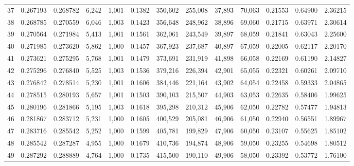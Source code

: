 \begin{tabular}{rrrrrrrrrrrrr}
37  &  0.267193 &  0.268782 &   6,242 &  1,001 &                                     0.1382 &  350,602 &  255,008 &   37,893 &   70,063 &  0.21553 &  0.64900 &  2.36215 \\
38  &  0.268785 &  0.270559 &   6,046 &  1,003 &                                     0.1423 &  356,648 &  248,962 &   38,896 &   69,060 &  0.21715 &  0.63971 &  2.30614 \\
39  &  0.270564 &  0.271984 &   5,413 &  1,001 &                                     0.1561 &  362,061 &  243,549 &   39,897 &   68,059 &  0.21841 &  0.63043 &  2.25600 \\
40  &  0.271985 &  0.273620 &   5,862 &  1,000 &                                     0.1457 &  367,923 &  237,687 &   40,897 &   67,059 &  0.22005 &  0.62117 &  2.20170 \\
41  &  0.273621 &  0.275295 &   5,768 &  1,001 &                                     0.1479 &  373,691 &  231,919 &   41,898 &   66,058 &  0.22169 &  0.61190 &  2.14827 \\
42  &  0.275296 &  0.276840 &   5,525 &  1,003 &                                     0.1536 &  379,216 &  226,394 &   42,901 &   65,055 &  0.22321 &  0.60261 &  2.09710 \\
43  &  0.276842 &  0.278514 &   5,230 &  1,001 &                                     0.1606 &  384,446 &  221,164 &   43,902 &   64,054 &  0.22458 &  0.59333 &  2.04865 \\
44  &  0.278515 &  0.280193 &   5,657 &  1,001 &                                     0.1503 &  390,103 &  215,507 &   44,903 &   63,053 &  0.22635 &  0.58406 &  1.99625 \\
45  &  0.280196 &  0.281866 &   5,195 &  1,003 &                                     0.1618 &  395,298 &  210,312 &   45,906 &   62,050 &  0.22782 &  0.57477 &  1.94813 \\
46  &  0.281867 &  0.283712 &   5,231 &  1,000 &                                     0.1605 &  400,529 &  205,081 &   46,906 &   61,050 &  0.22940 &  0.56551 &  1.89967 \\
47  &  0.283716 &  0.285542 &   5,252 &  1,000 &                                     0.1599 &  405,781 &  199,829 &   47,906 &   60,050 &  0.23107 &  0.55625 &  1.85102 \\
48  &  0.285542 &  0.287287 &   4,955 &  1,000 &                                     0.1679 &  410,736 &  194,874 &   48,906 &   59,050 &  0.23255 &  0.54698 &  1.80512 \\
49  &  0.287292 &  0.288889 &   4,764 &  1,000 &                                     0.1735 &  415,500 &  190,110 &   49,906 &   58,050 &  0.23392 &  0.53772 &  1.76100 \\

\end{tabular}
